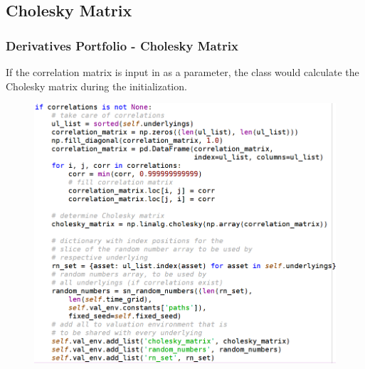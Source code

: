 \documentclass{beamer}
\begin{document}
\subsection{Cholesky Matrix}
\begin{frame}
\frametitle{Derivatives Portfolio - Cholesky Matrix}
If the correlation matrix is input in as a parameter, the class would calculate the Cholesky matrix during the initialization.
\begin{figure}[H]
	\includegraphics[scale=0.32]{derivatives_portfolio_cholesky_matrix.png}
\end{figure}
\end{frame}
\end{document}
